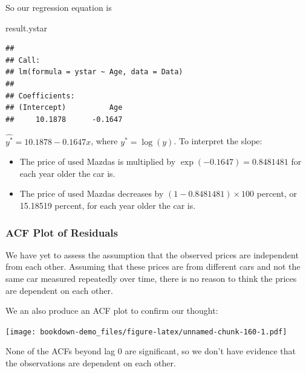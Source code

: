 \documentclass[
]{book}
\newenvironment{Shaded}{\begin{snugshade}}{\end{snugshade}}
\newcommand{\AttributeTok}[1]{\textcolor[rgb]{0.13,0.29,0.53}{#1}}
\newcommand{\FunctionTok}[1]{\textcolor[rgb]{0.13,0.29,0.53}{\textbf{#1}}}
\newcommand{\NormalTok}[1]{#1}
\newcommand{\SpecialCharTok}[1]{\textcolor[rgb]{0.81,0.36,0.00}{\textbf{#1}}}
\newcommand{\StringTok}[1]{\textcolor[rgb]{0.31,0.60,0.02}{#1}}
\providecommand{\tightlist}{%
  \setlength{\itemsep}{0pt}\setlength{\parskip}{0pt}}
\begin{document}
So our regression equation is

\begin{Shaded}
\begin{Highlighting}[]
\NormalTok{result.ystar}
\end{Highlighting}
\end{Shaded}

\begin{verbatim}
## 
## Call:
## lm(formula = ystar ~ Age, data = Data)
## 
## Coefficients:
## (Intercept)          Age  
##     10.1878      -0.1647
\end{verbatim}

\(\hat{y^*} = 10.1878 - 0.1647x\), where \(y^* = \log(y)\). To interpret the slope:

\begin{itemize}
\tightlist
\item
  The price of used Mazdas is multiplied by \(\exp(-0.1647) = 0.8481481\) for each year older the car is.
\item
  The price of used Mazdas decreases by \((1 - 0.8481481) \times 100\) percent, or 15.18519 percent, for each year older the car is.
\end{itemize}

\hypertarget{acf-plot-of-residuals}{%
\subsubsection*{ACF Plot of Residuals}\label{acf-plot-of-residuals}}

We have yet to assess the assumption that the observed prices are independent from each other. Assuming that these prices are from different cars and not the same car measured repeatedly over time, there is no reason to think the prices are dependent on each other.

We an also produce an ACF plot to confirm our thought:

\begin{Shaded}
\end{Shaded}

\texttt{[image: bookdown-demo\_files/figure-latex/unnamed-chunk-160-1.pdf]}

None of the ACFs beyond lag 0 are significant, so we don't have evidence that the observations are dependent on each other.
\end{document}
